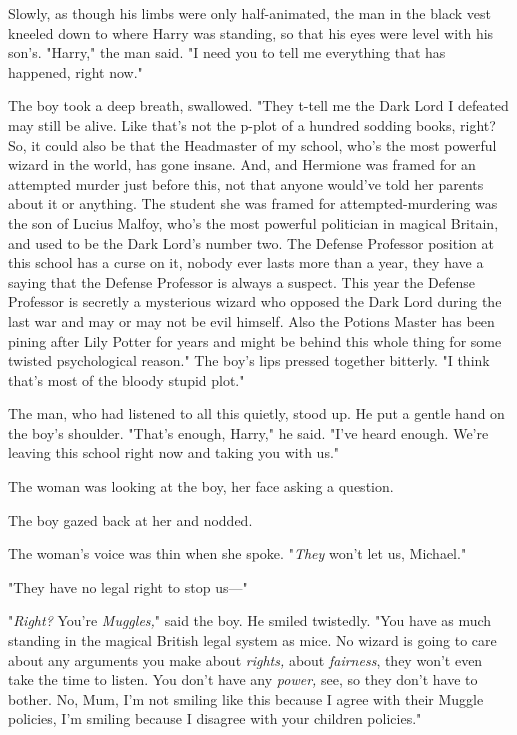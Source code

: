 Slowly, as though his limbs were only half-animated, the man in the black vest 
kneeled down to where Harry was standing, so that his eyes were level with his 
son's. "Harry," the man said. "I need you to tell me everything that has 
happened, right now."

The boy took a deep breath, swallowed. "They t-tell me the Dark Lord I defeated 
may still be alive. Like that's not the p-plot of a hundred sodding books, 
right? So, it could also be that the Headmaster of my school, who's the most 
powerful wizard in the world, has gone insane. And, and Hermione was framed for 
an attempted murder just before this, not that anyone would've told her parents 
about it or anything. The student she was framed for attempted-murdering was 
the son of Lucius Malfoy, who's the most powerful politician in magical 
Britain, and used to be the Dark Lord's number two. The Defense Professor 
position at this school has a curse on it, nobody ever lasts more than a year, 
they have a saying that the Defense Professor is always a suspect. This year 
the Defense Professor is secretly a mysterious wizard who opposed the Dark Lord 
during the last war and may or may not be evil himself. Also the Potions Master 
has been pining after Lily Potter for years and might be behind this whole 
thing for some twisted psychological reason." The boy's lips pressed together 
bitterly. "I think that's most of the bloody stupid plot."

The man, who had listened to all this quietly, stood up. He put a gentle hand 
on the boy's shoulder. "That's enough, Harry," he said. "I've heard enough. 
We're leaving this school right now and taking you with us."

The woman was looking at the boy, her face asking a question.

The boy gazed back at her and nodded.

The woman's voice was thin when she spoke. "\emph{They} won't let us, Michael."

"They have no legal right to stop us---"

"\emph{Right?} You're \emph{Muggles,}" said the boy. He smiled twistedly. "You 
have as much standing in the magical British legal system as mice. No wizard is 
going to care about any arguments you make about \emph{rights,} about 
\emph{fairness}, they won't even take the time to listen. You don't have any 
\emph{power,} see, so they don't have to bother. No, Mum, I'm not smiling like 
this because I agree with their Muggle policies, I'm smiling because I disagree 
with your children policies."

